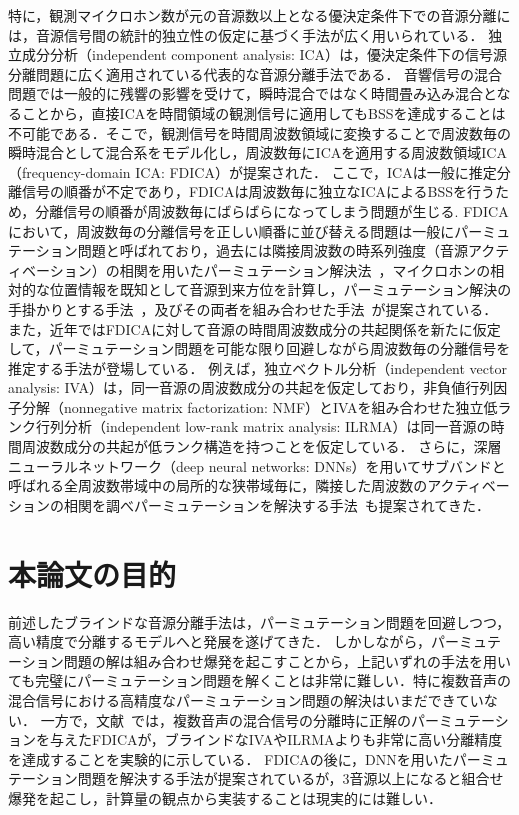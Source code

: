 特に，観測マイクロホン数が元の音源数以上となる優決定条件下での音源分離には，音源信号間の統計的独立性の仮定に基づく手法が広く用いられている．
独立成分分析（independent component analysis: ICA）\cite{ICA}は，優決定条件下の信号源分離問題に広く適用されている代表的な音源分離手法である．
音響信号の混合問題では一般的に残響の影響を受けて，瞬時混合ではなく時間畳み込み混合となることから，直接ICAを時間領域の観測信号に適用してもBSSを達成することは不可能である．そこで，観測信号を時間周波数領域に変換することで周波数毎の瞬時混合として混合系をモデル化し，周波数毎にICAを適用する周波数領域ICA（frequency-domain ICA: FDICA）\cite{FDICA}が提案された．
ここで，ICAは一般に推定分離信号の順番が不定であり，FDICAは周波数毎に独立なICAによるBSSを行うため，分離信号の順番が周波数毎にばらばらになってしまう問題が生じる.
FDICAにおいて，周波数毎の分離信号を正しい順番に並び替える問題は一般にパーミュテーション問題と呼ばれており，過去には隣接周波数の時系列強度（音源アクティベーション）の相関を用いたパーミュテーション解決法~\cite{COR}，マイクロホンの相対的な位置情報を既知として音源到来方位を計算し，パーミュテーション解決の手掛かりとする手法~\cite{DOA}，及びその両者を組み合わせた手法~\cite{DOACOR}が提案されている．
また，近年ではFDICAに対して音源の時間周波数成分の共起関係を新たに仮定して，パーミュテーション問題を可能な限り回避しながら周波数毎の分離信号を推定する手法が登場している．
例えば，独立ベクトル分析（independent vector analysis: IVA）\cite{IVA1,IVA2}は，同一音源の周波数成分の共起を仮定しており，非負値行列因子分解（nonnegative matrix factorization: NMF）\cite{NMF}とIVAを組み合わせた独立低ランク行列分析（independent low-rank matrix analysis: ILRMA）\cite{ILRMA1,ILRMA2}は同一音源の時間周波数成分の共起が低ランク構造を持つことを仮定している．
さらに，深層ニューラルネットワーク（deep neural networks: DNNs）を用いてサブバンドと呼ばれる全周波数帯域中の局所的な狭帯域毎に，隣接した周波数のアクティベーションの相関を調べパーミュテーションを解決する手法~\cite{DNN_soluver}も提案されてきた．

\section{本論文の目的}
前述したブラインドな音源分離手法は，パーミュテーション問題を回避しつつ，高い精度で分離するモデルへと発展を遂げてきた．
しかしながら，パーミュテーション問題の解は組み合わせ爆発を起こすことから，上記いずれの手法を用いても完璧にパーミュテーション問題を解くことは非常に難しい．特に複数音声の混合信号における高精度なパーミュテーション問題の解決はいまだできていない．
一方で，文献~\cite{EU}では，複数音声の混合信号の分離時に正解のパーミュテーションを与えたFDICAが，ブラインドなIVAやILRMAよりも非常に高い分離精度を達成することを実験的に示している．
FDICAの後に，DNNを用いたパーミュテーション問題を解決する手法が提案されているが，3音源以上になると組合せ爆発を起こし，計算量の観点から実装することは現実的には難しい．

